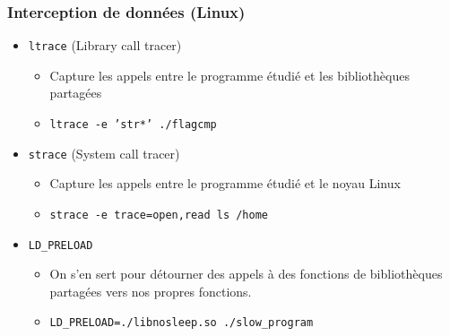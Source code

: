 \documentclass[10pt,xcolor={table,dvipsnames},t]{beamer}
\begin{document}
\begin{frame}
    \frametitle{Interception de données (Linux)}

    \begin{itemize}
        \item \texttt{ltrace} (Library call tracer)
        \begin{itemize}
            \item Capture les appels entre le programme étudié et les bibliothèques partagées
            \item \texttt{ltrace -e 'str*' ./flagcmp}
        \end{itemize}
        \item \texttt{strace} (System call tracer)
        \begin{itemize}
            \item Capture les appels entre le programme étudié et le noyau Linux
            \item \texttt{strace -e trace=open,read ls /home}
        \end{itemize}
        \item \texttt{LD\_PRELOAD}
        \begin{itemize}
            \item On s'en sert pour détourner des appels à des fonctions de bibliothèques partagées vers nos propres fonctions. 
            \item \texttt{LD\_PRELOAD=./libnosleep.so ./slow\_program}
        \end{itemize}
    \end{itemize}

\end{frame}
\end{document}
